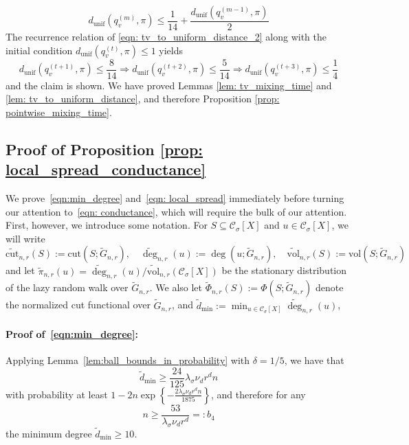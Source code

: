 \documentclass[11pt,twoside]{article}
\newcommand{\set}[1]{\left\{#1\right\}}
\newcommand{\vol}{\mathrm{vol}}
\newcommand{\cut}{\mathrm{cut}}
\newcommand{\1}{\mathbbm{1}}
\newcommand{\Xbf}{X}
\newcommand{\Cset}{\mathcal{C}}
\newcommand{\Csig}{\Cset_{\sigma}}
\newcommand{\degminwt}{\widetilde{d}_{\min}}
\begin{document}
\begin{equation}
d_{\textrm{unif}}(q_v^{(m)}, \pi) \leq \frac{1}{14} + \frac{d_{\textrm{unif}}(q_v^{(m - 1)}, \pi)}{2} \label{eqn: tv_to_uniform_distance_2}
\end{equation}
The recurrence relation of \eqref{eqn: tv_to_uniform_distance_2} along with the initial condition $d_{\textrm{unif}}(q_v^{(t)}, \pi) \leq 1$ yields
\begin{equation*}
d_{\textrm{unif}}(q_v^{(t + 1)}, \pi) \leq \frac{8}{14} \Rightarrow d_{\textrm{unif}}(q_v^{(t + 2)}, \pi) \leq \frac{5}{14} \Rightarrow  d_{\textrm{unif}}(q_v^{(t + 3)}, \pi) \leq \frac{1}{4}
\end{equation*}
and the claim is shown. We have proved Lemmas \ref{lem: tv_mixing_time} and \ref{lem: tv_to_uniform_distance}, and therefore Proposition \ref{prop: pointwise_mixing_time}.

\subsection{Proof of Proposition \ref{prop: local_spread_conductance}}

We prove~\eqref{eqn:min_degree} and~\eqref{eqn: local_spread} immediately before turning our attention to~\eqref{eqn: conductance}, which will require the bulk of our attention. First, however, we introduce some notation. For $S \subseteq \Csig[\Xbf]$ and $u \in \Csig[\Xbf]$, we will write
\begin{equation*}
\widetilde{\cut}_{n,r}(S) := \cut(S; \widetilde{G}_{n,r}), \quad \widetilde{\deg}_{n,r}(u) := \deg(u; \widetilde{G}_{n,r}), \quad 
\widetilde{\vol}_{n,r}(S) := \vol(S; \widetilde{G}_{n,r})
\end{equation*}
and let $\widetilde{\pi}_{n,r}(u) = \widetilde{\deg}_{n,r}(u)/\widetilde{\vol}_{n,r}(\Csig[\Xbf])$ be the stationary distribution of the lazy random walk over $\widetilde{G}_{n,r}$. We also let $\widetilde{\Phi}_{n,r}(S) := \Phi(S; \widetilde{G}_{n,r})$ denote the normalized cut functional over $\widetilde{G}_{n,r}$, and $\degminwt := \min_{u \in \Csig[\Xbf]} \widetilde{\deg}_{n,r}(u)$,

\paragraph{Proof of~\eqref{eqn:min_degree}:}
Applying Lemma~\ref{lem:ball_bounds_in_probability} with $\delta = 1/5$, we have that
\begin{equation*}
\widetilde{d}_{\min} \geq \frac{24}{125} \lambda_{\sigma} \nu_d r^d n
\end{equation*} 
with probability at least $1 - 2n\exp\set{-\frac{2\lambda_{\sigma} \nu_d r^d n}{1875}}$, and therefore for any  
\begin{equation*}
n \geq \frac{53}{\lambda_\sigma \nu_dr^d} =: b_4
\end{equation*}
the minimum degree $\widetilde{d}_{\min} \geq 10$. 
\end{document}
